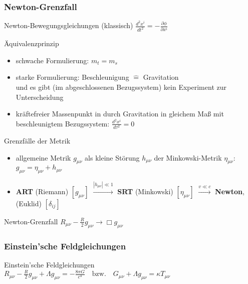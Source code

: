 \documentclass{beamer}
\begin{document}
\begin{frame}\frametitle{Newton-Grenzfall}


\begin{block}{Newton-Bewegungsgleichungen (klassisch)}
$\frac{d^2x^i}{dt^2} = - \frac{\partial \phi}{\partial x^i}$
\end{block}

\begin{block}{Äquivalenzprinzip}

\begin{itemize}\tiny
\item schwache Formulierung: $m_t = m_s$
\item starke Formulierung: Beschleunigung $\hat{=}$ Gravitation\\ und es gibt (im abgeschlossenen Bezugssystem) kein Experiment zur Unterscheidung
\item kräftefreier Massenpunkt in durch Gravitation in gleichem Maß mit beschleunigtem Bezugssystem: $\frac{d^2x^i}{d\tau^2} = 0$
\end{itemize}

\end{block}

\begin{block}{Grenzfälle der Metrik}

\begin{itemize}\tiny
\item allgemeine Metrik $g_{\mu\nu}$ als kleine Störung $h_{\mu\nu}$ der Minkowski-Metrik $\eta_{\mu\nu}$: $g_{\mu \nu} = \eta_{\mu \nu} + h_{\mu \nu}$
\item \textbf{ART} (Riemann) $[g_{\mu\nu}]$ $\overset{|h_{\mu\nu}|\ll 1}{\longrightarrow}$ \textbf{SRT} (Minkowski) $[\eta_{\mu\nu}]$ $\overset{v \ll c}{\longrightarrow}$ \textbf{Newton}, (Euklid) $[\delta_{ij}]$
\end{itemize}

\end{block}

\begin{block}{Newton-Grenzfall}
$R_{\mu\nu} - \frac{R}{2}g_{\mu\nu} \rightarrow \Box g_{\mu\nu}$
\end{block}

\end{frame}

\begin{frame}\frametitle{Einstein'sche Feldgleichungen}

\begin{block}{Einstein'sche Feldgleichungen}
$R_{\mu\nu} - \frac{R}{2} g_{\mu\nu} + \Lambda g_{\mu\nu} = -\frac{8 \pi G}{c^4} \quad \text{bzw.} \quad G_{\mu\nu} + \Lambda g_{\mu\nu} = \kappa T_{\mu\nu}$
\end{block}

\end{frame}
\end{document}
